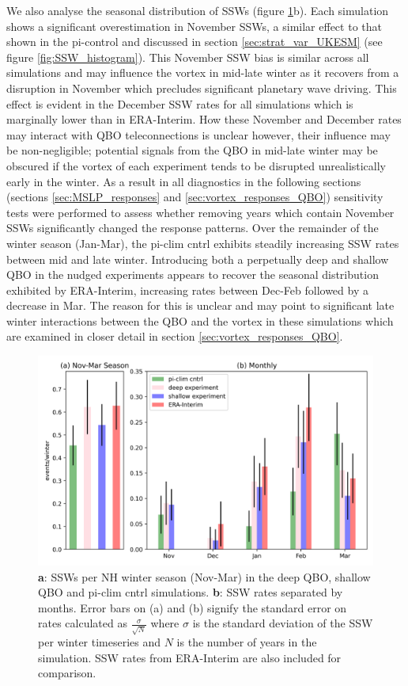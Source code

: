 We also analyse the seasonal distribution of SSWs (figure \ref{fig:SSW_histogram_experiments}b). Each simulation shows a significant overestimation in November SSWs, a similar effect to that shown in the pi-control and discussed in section \ref{sec:strat_var_UKESM} (see figure \ref{fig:SSW_histogram}). This November SSW bias is similar across all simulations and may influence the vortex in mid-late winter as it recovers from a disruption in November which precludes significant planetary wave driving. This effect is evident in the December SSW rates for all simulations which is marginally lower than in ERA-Interim. How these November and December rates may interact with QBO teleconnections is unclear however, their influence may be non-negligible; potential signals from the QBO in mid-late winter may be obscured if the vortex of each experiment tends to be disrupted unrealistically early in the winter. As a result in all diagnostics in the following sections (sections \ref{sec:MSLP_responses} and \ref{sec:vortex_responses_QBO}) sensitivity tests were performed to assess whether removing years which contain November SSWs significantly changed the response patterns. Over the remainder of the winter season (Jan-Mar), the pi-clim cntrl exhibits steadily increasing SSW rates between mid and late winter. Introducing both a perpetually deep and shallow QBO in the nudged experiments appears to recover the seasonal distribution exhibited by ERA-Interim, increasing rates between Dec-Feb followed by a decrease in Mar. The reason for this is unclear and may point to significant late winter interactions between the QBO and the vortex in these simulations which are examined in closer detail in section \ref{sec:vortex_responses_QBO}.

\begin{figure}[h!]
\begin{center}
\noindent\includegraphics[width = 0.8\linewidth]{Figures/Figures-deepQBO/SSW_hist.png}
\caption[SSWs per NH winter season in QBO experiments]{\textbf{a}: SSWs per NH winter season (Nov-Mar) in the deep QBO, shallow QBO and pi-clim cntrl simulations. \textbf{b}: SSW rates separated by months. Error bars on (a) and (b) signify the standard error on rates calculated as $\frac{\sigma}{\sqrt{N}}$ where $\sigma$ is the standard deviation of the SSW per winter timeseries and $N$ is the number of years in the simulation. SSW rates from ERA-Interim are also included for comparison.}
\label{fig:SSW_histogram_experiments}
\end{center}
\end{figure}

